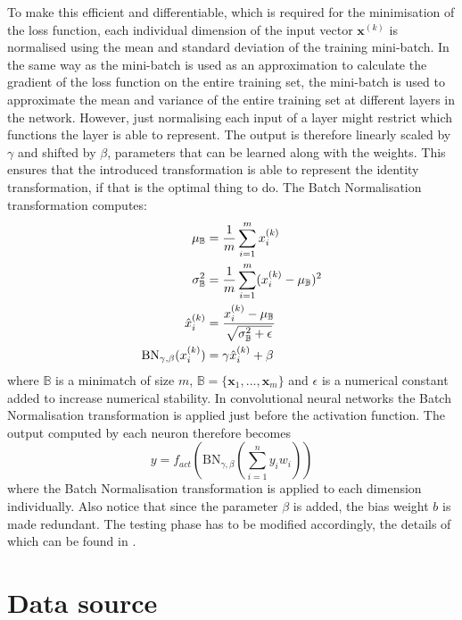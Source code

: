 \documentclass[12pt,a4paper,twoside,openright]{report}
\begin{document}
To make this efficient and differentiable, which is required for the minimisation of the loss function, each individual dimension of the input vector $\textbf{x}^{(k)}$ is normalised using the mean and standard deviation of the training mini-batch. In the same way as the mini-batch is used as an approximation to calculate the gradient of the loss function on the entire training set, the mini-batch is used to approximate the mean and variance of the entire training set at different layers in the network. However, just normalising each input of a layer might restrict which functions the layer is able to represent. The output is therefore linearly scaled by $\gamma$ and shifted by $\beta$, parameters that can be learned along with the weights. This ensures that the introduced transformation is able to represent the identity transformation, if that is the optimal thing to do. The Batch Normalisation transformation computes:
\begin{equation}
\begin{split}
	\mu_{\mathbb{B}}  & = \frac{1}{m}\sum_{i=1}^m x^{(k)}_i \\	
	\sigma^2_{\mathbb{B}}  & = \frac{1}{m}\sum_{i=1}^m (x^{(k)}_i - \mu_{\mathbb{B}})^2 \\	
	\hat{x}^{(k)}_i & = \cfrac{x^{(k)}_i - \mu_{\mathbb{B}}}{\sqrt{\sigma^2_{\mathbb{B}} + \epsilon}} \\
	\textrm{BN}_{\gamma, \beta}(x^{(k)}_i) & = \gamma \hat{x}^{(k)}_i + \beta
\end{split}
\end{equation}
where $\mathbb{B}$ is a minimatch of size $m$, $\mathbb{B} = \{ \textbf{x}_1, ... , \textbf{x}_m \}$ and $\epsilon$ is a numerical constant added to increase numerical stability.
In convolutional neural networks the Batch Normalisation transformation is applied just before the activation function. The output computed by each neuron therefore becomes
\begin{equation}
		y = f_{act}(\textrm{BN}_{\gamma, \beta}(\sum_{i=1}^{n} y_i w_i))
\end{equation}
where the Batch Normalisation transformation is applied to each dimension individually. Also notice that since the parameter $\beta$ is added, the bias weight $b$ is made redundant. The testing phase has to be modified accordingly, the details of which can be found in \cite{batch_normalization}.

\section{Data source}
\end{document}
